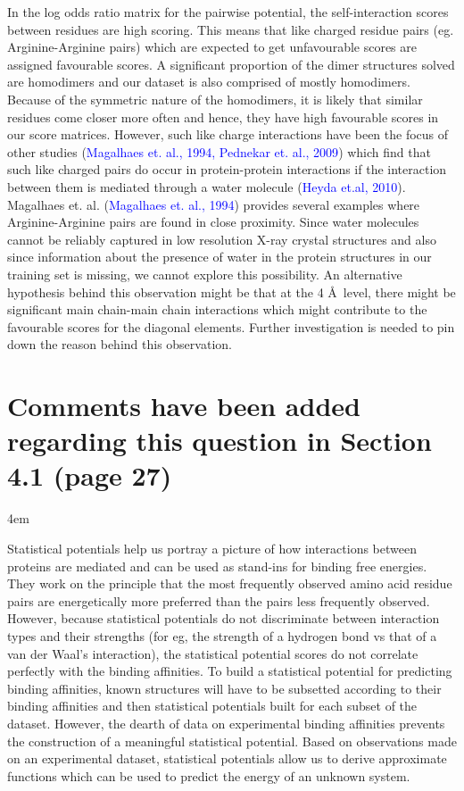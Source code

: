 \documentclass[a4paper, 12pt, twoside]{article}
\begin{document}
 In the log odds ratio matrix for the pairwise potential, the self-interaction scores between residues are high scoring. This means that like charged residue pairs (eg. Arginine-Arginine pairs) which are expected to get unfavourable scores are assigned favourable scores. A significant proportion of the dimer structures solved are homodimers and our dataset is also comprised of mostly homodimers. Because of the symmetric nature of the homodimers, it is likely that similar residues come closer more often and hence, they have high favourable scores in our score matrices. However, such like charge interactions have been the focus of other studies (\textcolor{blue}{Magalhaes et. al., 1994, Pednekar et. al., 2009}) which find that such like charged pairs do occur in protein-protein interactions if the interaction between them is mediated through a water molecule (\textcolor{blue}{Heyda et.al, 2010}). Magalhaes et. al. (\textcolor{blue}{Magalhaes et. al., 1994}) provides several examples where Arginine-Arginine pairs are found in close proximity. Since water molecules cannot be reliably captured in low resolution X-ray crystal structures and also since information about the presence of water in the protein structures in our training set is missing, we cannot explore this possibility. An alternative hypothesis behind this observation might be that at the 4 \AA\ level, there might be significant main chain-main chain interactions which might contribute to the favourable scores for the diagonal elements. Further investigation is needed to pin down the reason behind this observation.
\par
\endgroup

\section{Comments have been added regarding this question in Section 4.1 (page 27)}

\par
\begingroup
\footnotesize
\leftskip4em
\rightskip\leftskip

Statistical potentials help us portray a picture of how interactions between proteins are mediated and can be used as stand-ins for binding free energies. They work on the principle that the most frequently observed amino acid residue pairs are energetically more preferred than the pairs less frequently observed. However, because statistical potentials do not discriminate between interaction types and their strengths (for eg, the strength of a hydrogen bond vs that of a van der Waal's interaction), the statistical potential scores do not correlate perfectly with the binding affinities. To build a statistical potential for predicting binding affinities, known structures will have to be subsetted according to their binding affinities and then statistical potentials built for each subset of the dataset. However, the dearth of data on experimental binding affinities prevents the construction of a meaningful statistical potential. Based on observations made on an experimental dataset, statistical potentials allow us to derive approximate functions which can be used to predict the energy of an unknown system.
\par
\endgroup
\end{document}
